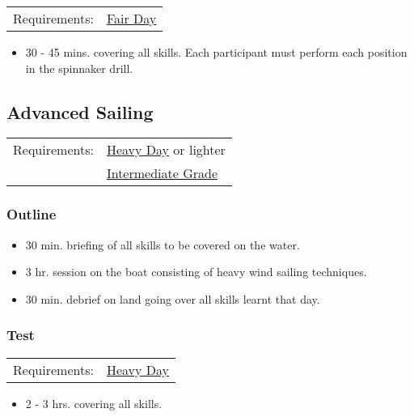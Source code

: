 \documentclass[12pt]{scrartcl}
\begin{document}
\label{tab:spinnaker drill:test:requirements}
\begin{tabular}{ll}
	Requirements: & \hyperlink{condition:fair day}{Fair Day} \\
\end{tabular}

\begin{itemize}
	\item 30 - 45 mins. covering all skills. Each participant must perform each position in the spinnaker drill.
\end{itemize}

\subsection{Advanced Sailing} \label{subsec:advanced sailing}

\label{tab:advanced sailing:requirements}
\begin{tabular}{ll}
	Requirements: & \hyperlink{condition:heavy day}{Heavy Day} or lighter \\
	& \hyperlink{grade:intermediate}{Intermediate Grade} \\
\end{tabular}

\subsubsection{Outline} \label{subsubsec:advanced sailing:outline}

\begin{itemize}
	\item 30 min. briefing of all skills to be covered on the water.
	\item 3 hr. session on the boat consisting of heavy wind sailing techniques.
	\item 30 min. debrief on land going over all skills learnt that day.
\end{itemize}

\subsubsection{Test} \label{subsubsec:advanced sailing:test}

\label{tab:advanced sailing:test:requirements}
\begin{tabular}{ll}
	Requirements: & \hyperlink{condition:heavy day}{Heavy Day} \\
\end{tabular}

\begin{itemize}
	\item 2 - 3 hrs. covering all skills.
\end{itemize}
\end{document}
